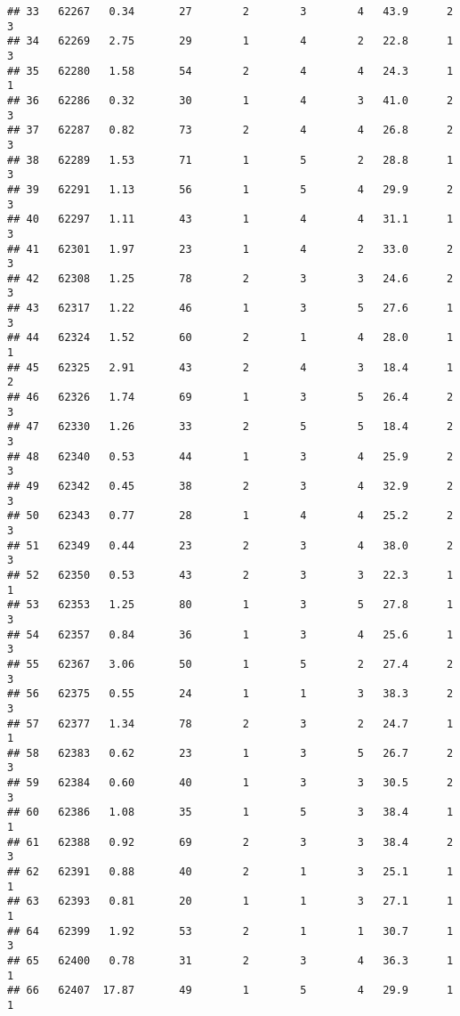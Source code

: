 \documentclass[
]{article}
\begin{document}
\begin{verbatim}
## 33   62267   0.34       27        2        3        4   43.9      2      3
## 34   62269   2.75       29        1        4        2   22.8      1      3
## 35   62280   1.58       54        2        4        4   24.3      1      1
## 36   62286   0.32       30        1        4        3   41.0      2      3
## 37   62287   0.82       73        2        4        4   26.8      2      3
## 38   62289   1.53       71        1        5        2   28.8      1      3
## 39   62291   1.13       56        1        5        4   29.9      2      3
## 40   62297   1.11       43        1        4        4   31.1      1      3
## 41   62301   1.97       23        1        4        2   33.0      2      3
## 42   62308   1.25       78        2        3        3   24.6      2      3
## 43   62317   1.22       46        1        3        5   27.6      1      3
## 44   62324   1.52       60        2        1        4   28.0      1      1
## 45   62325   2.91       43        2        4        3   18.4      1      2
## 46   62326   1.74       69        1        3        5   26.4      2      3
## 47   62330   1.26       33        2        5        5   18.4      2      3
## 48   62340   0.53       44        1        3        4   25.9      2      3
## 49   62342   0.45       38        2        3        4   32.9      2      3
## 50   62343   0.77       28        1        4        4   25.2      2      3
## 51   62349   0.44       23        2        3        4   38.0      2      3
## 52   62350   0.53       43        2        3        3   22.3      1      1
## 53   62353   1.25       80        1        3        5   27.8      1      3
## 54   62357   0.84       36        1        3        4   25.6      1      3
## 55   62367   3.06       50        1        5        2   27.4      2      3
## 56   62375   0.55       24        1        1        3   38.3      2      3
## 57   62377   1.34       78        2        3        2   24.7      1      1
## 58   62383   0.62       23        1        3        5   26.7      2      3
## 59   62384   0.60       40        1        3        3   30.5      2      3
## 60   62386   1.08       35        1        5        3   38.4      1      1
## 61   62388   0.92       69        2        3        3   38.4      2      3
## 62   62391   0.88       40        2        1        3   25.1      1      1
## 63   62393   0.81       20        1        1        3   27.1      1      1
## 64   62399   1.92       53        2        1        1   30.7      1      3
## 65   62400   0.78       31        2        3        4   36.3      1      1
## 66   62407  17.87       49        1        5        4   29.9      1      1

\end{verbatim}
\end{document}
